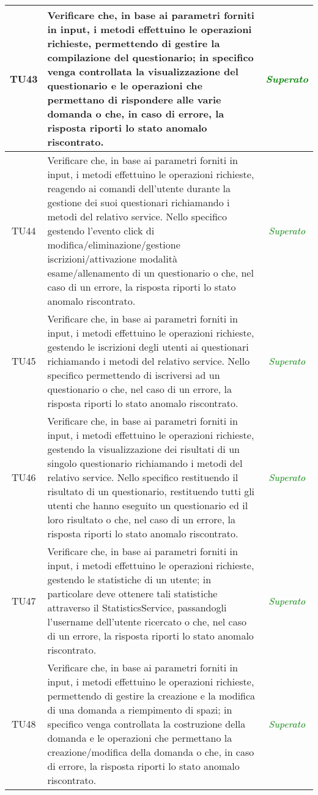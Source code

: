 \begin{longtable}{|c|>{}m{10cm}|c|}
\hypertarget{TU43}{TU43} & Verificare che, in base ai parametri forniti in input, i metodi effettuino le operazioni richieste, permettendo di gestire la compilazione del questionario; in specifico venga controllata la visualizzazione del questionario e le operazioni che permettano di rispondere alle varie domanda o che, in caso di errore, la risposta riporti lo stato anomalo riscontrato. & \textcolor{Green}{\textit{Superato}}\\ \hline
\hypertarget{TU44}{TU44} & Verificare che, in base ai parametri forniti in input, i metodi effettuino le operazioni richieste, reagendo ai comandi dell'utente durante la gestione dei suoi questionari richiamando i metodi del relativo service. Nello specifico gestendo l'evento click di modifica/eliminazione/gestione iscrizioni/attivazione modalità esame/allenamento di un questionario o che, nel caso di un errore, la risposta riporti lo stato anomalo riscontrato. & \textcolor{Green}{\textit{Superato}}\\ \hline
\hypertarget{TU45}{TU45} & Verificare che, in base ai parametri forniti in input, i metodi effettuino le operazioni richieste, gestendo le iscrizioni degli utenti ai questionari richiamando i metodi del relativo service. Nello specifico permettendo di iscriversi ad un questionario o che, nel caso di un errore, la risposta riporti lo stato anomalo riscontrato. & \textcolor{Green}{\textit{Superato}}\\ \hline
\hypertarget{TU46}{TU46} & Verificare che, in base ai parametri forniti in input, i metodi effettuino le operazioni richieste, gestendo la visualizzazione dei risultati di un singolo questionario richiamando i metodi del relativo service. Nello specifico restituendo il risultato di un questionario, restituendo tutti gli utenti che hanno eseguito un questionario ed il loro risultato o che, nel caso di un errore, la risposta riporti lo stato anomalo riscontrato. & \textcolor{Green}{\textit{Superato}}\\ \hline
\hypertarget{TU47}{TU47} & Verificare che, in base ai parametri forniti in input, i metodi effettuino le operazioni richieste, gestendo le statistiche di un utente; in particolare deve ottenere tali statistiche attraverso il StatisticsService, passandogli l'username dell'utente ricercato o che, nel caso di un errore, la risposta riporti lo stato anomalo riscontrato. & \textcolor{Green}{\textit{Superato}}\\ \hline
\hypertarget{TU48}{TU48} & Verificare che, in base ai parametri forniti in input, i metodi effettuino le operazioni richieste, permettendo di gestire la creazione e la modifica di una domanda a riempimento di spazi; in specifico venga controllata la costruzione della domanda e le operazioni che permettano la creazione/modifica della domanda o che, in caso di errore, la risposta riporti lo stato anomalo riscontrato. & \textcolor{Green}{\textit{Superato}}\\ \hline

\end{longtable}
